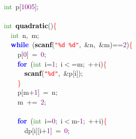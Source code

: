{{\mbox{}\textcolor{ForestGreen}{int}\ p\textcolor{BrickRed}{[}\textcolor{Purple}{1005}\textcolor{BrickRed}{];} \\
\mbox{} \\
\mbox{}\textcolor{ForestGreen}{int}\ \textbf{\textcolor{Black}{quadratic}}\textcolor{BrickRed}{()}\textcolor{Red}{\{} \\
\mbox{}\ \ \textcolor{ForestGreen}{int}\ n\textcolor{BrickRed}{,}\ m\textcolor{BrickRed}{;} \\
\mbox{}\ \ \textbf{\textcolor{Blue}{while}}\ \textcolor{BrickRed}{(}\textbf{\textcolor{Black}{scanf}}\textcolor{BrickRed}{(}\texttt{\textcolor{Red}{"{}\%d\ \%d"{}}}\textcolor{BrickRed}{,}\ \textcolor{BrickRed}{\&}n\textcolor{BrickRed}{,}\ \textcolor{BrickRed}{\&}m\textcolor{BrickRed}{)==}\textcolor{Purple}{2}\textcolor{BrickRed}{)}\textcolor{Red}{\{} \\
\mbox{}\ \ \ \ p\textcolor{BrickRed}{[}\textcolor{Purple}{0}\textcolor{BrickRed}{]}\ \textcolor{BrickRed}{=}\ \textcolor{Purple}{0}\textcolor{BrickRed}{;} \\
\mbox{}\ \ \ \ \textbf{\textcolor{Blue}{for}}\ \textcolor{BrickRed}{(}\textcolor{ForestGreen}{int}\ i\textcolor{BrickRed}{=}\textcolor{Purple}{1}\textcolor{BrickRed}{;}\ i\textcolor{BrickRed}{$<$=}m\textcolor{BrickRed}{;}\ \textcolor{BrickRed}{++}i\textcolor{BrickRed}{)}\textcolor{Red}{\{} \\
\mbox{}\ \ \ \ \ \ \textbf{\textcolor{Black}{scanf}}\textcolor{BrickRed}{(}\texttt{\textcolor{Red}{"{}\%d"{}}}\textcolor{BrickRed}{,}\ \textcolor{BrickRed}{\&}p\textcolor{BrickRed}{[}i\textcolor{BrickRed}{]);} \\
\mbox{}\ \ \ \ \textcolor{Red}{\}} \\
\mbox{}\ \ \ \ p\textcolor{BrickRed}{[}m\textcolor{BrickRed}{+}\textcolor{Purple}{1}\textcolor{BrickRed}{]}\ \textcolor{BrickRed}{=}\ n\textcolor{BrickRed}{;} \\
\mbox{}\ \ \ \ m\ \textcolor{BrickRed}{+=}\ \textcolor{Purple}{2}\textcolor{BrickRed}{;} \\
\mbox{} \\
\mbox{}\ \ \ \ \textbf{\textcolor{Blue}{for}}\ \textcolor{BrickRed}{(}\textcolor{ForestGreen}{int}\ i\textcolor{BrickRed}{=}\textcolor{Purple}{0}\textcolor{BrickRed}{;}\ i\textcolor{BrickRed}{$<$}m\textcolor{BrickRed}{-}\textcolor{Purple}{1}\textcolor{BrickRed}{;}\ \textcolor{BrickRed}{++}i\textcolor{BrickRed}{)}\textcolor{Red}{\{} \\
\mbox{}\ \ \ \ \ \ dp\textcolor{BrickRed}{[}i\textcolor{BrickRed}{][}i\textcolor{BrickRed}{+}\textcolor{Purple}{1}\textcolor{BrickRed}{]}\ \textcolor{BrickRed}{=}\ \textcolor{Purple}{0}\textcolor{BrickRed}{;} \\
}}
